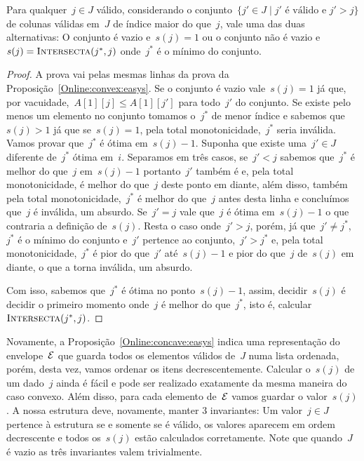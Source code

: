 \begin{prop} \label{Online:concave:easys}
Para qualquer~$j \in J$ válido, considerando o conjunto~${ \{j' \in J \mid j' \text{ é válido e } j' > j\} }$ de colunas válidas em~$J$ de índice maior do que~$j$, vale uma das duas alternativas: O conjunto é vazio e~${ s(j) = 1 }$ ou o conjunto não é vazio e~${ s(j) = \textsc{Intersecta}(j^*,j) }$ onde~$j^*$ é o mínimo do conjunto.
\end{prop}

\begin{proof}
A prova vai pelas mesmas linhas da prova da Proposição~\ref{Online:convex:easys}. Se o conjunto é vazio vale~$s(j) = 1$ já que, por vacuidade,~${ A[1][j] \leq A[1][j'] }$  para todo~$j'$ do conjunto. Se existe pelo menos um elemento no conjunto tomamos o~$j^*$ de menor índice e sabemos que~$s(j) > 1$ já que se~$s(j) = 1$, pela total monotonicidade,~$j^*$ seria inválida. Vamos provar que~$j^*$ é ótima em~$s(j) - 1$. Suponha que existe uma~$j' \in J$ diferente de~$j^*$ ótima em~$i$. Separamos em três casos, se~$j' < j$ sabemos que~$j^*$ é melhor do que~$j$ em~$s(j) - 1$ portanto~$j'$ também é e, pela total monotonicidade, é melhor do que~$j$ deste ponto em diante, além disso, também pela total monotonicidade,~$j^*$ é melhor do que~$j$ antes desta linha e concluímos que~$j$ é inválida, um absurdo. Se~$j' = j$ vale que~$j$ é ótima em~$s(j) - 1$ o que contraria a definição de~$s(j)$. Resta o caso onde~$j' > j$, porém, já que~$j' \neq j^*$,~$j^*$ é o mínimo do conjunto e~$j'$ pertence ao conjunto,~$j' > j^*$ e, pela total monotonicidade,~$j^*$ é pior do que~$j'$ até~$s(j)-1$ e pior do que~$j$ de~$s(j)$ em diante, o que a torna inválida, um absurdo.

Com isso, sabemos que~$j^*$ é ótima no ponto~$s(j) - 1$, assim, decidir~$s(j)$ é decidir o primeiro momento onde~$j$ é melhor do que~$j^*$, isto é, calcular~$\textsc{Intersecta}(j^*,j)$.
\end{proof}

Novamente, a Proposição~\ref{Online:concave:easys} indica uma representação do envelope~$\mathcal{E}$ que guarda todos os elementos válidos de~$J$ numa lista ordenada, porém, desta vez, vamos ordenar os itens decrescentemente. Calcular o~$s(j)$ de um dado~$j$ ainda é fácil e pode ser realizado exatamente da mesma maneira do caso convexo. Além disso, para cada elemento de~$\mathcal{E}$ vamos guardar o valor~$s(j)$. A nossa estrutura deve, novamente, manter 3 invariantes: Um valor~$j \in J$ pertence à estrutura se e somente se é válido, os valores aparecem em ordem decrescente e todos os~$s(j)$ estão calculados corretamente. Note que quando~$J$ é vazio as três invariantes valem trivialmente.

